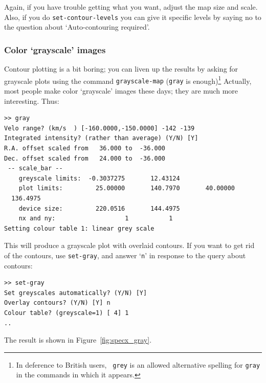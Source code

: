 \documentclass[11pt,twoside]{article}
\begin{document}
Again, if you have trouble getting what you want, adjust the map size
and scale.  Also, if you do {\tt set-contour-levels} you can give it
specific levels by saying no to the question about `Auto-contouring
required'.

\subsubsection{Color `grayscale' images}
\label{sec:grayscale}
Contour plotting is a bit boring; you can liven up the results by
asking for grayscale plots using the command {\tt grayscale-map}
({\tt{gray}} is enough)\footnote{In deference to British users, {\tt
grey} is an allowed alternative spelling for {\tt gray} in the commands
in which it appears.}  Actually, most people make color `grayscale'
images these days; they are much more interesting. Thus:

\begin{verbatim}
>> gray
Velo range? (km/s  ) [-160.0000,-150.0000] -142 -139
Integrated intensity? (rather than average) (Y/N) [Y]
R.A. offset scaled from   36.000 to  -36.000
Dec. offset scaled from   24.000 to  -36.000
 -- scale_bar --
    greyscale limits:  -0.3037275       12.43124
    plot limits:         25.00000       140.7970       40.00000
  136.4975
    device size:         220.0516       144.4975
    nx and ny:                   1           1
Setting colour table 1: linear grey scale
\end{verbatim}

This will produce a grayscale plot with overlaid contours. If you want
to get rid of the contours, use {\tt set-gray}, and answer `{\tt n}'
in response to the query about contours:

\begin{verbatim}
>> set-gray
Set greyscales automatically? (Y/N) [Y]
Overlay contours? (Y/N) [Y] n
Colour table? (greyscale=1) [ 4] 1
..
\end{verbatim}

The result is shown in Figure~\ref{fig:specx_gray}.
\end{document}

